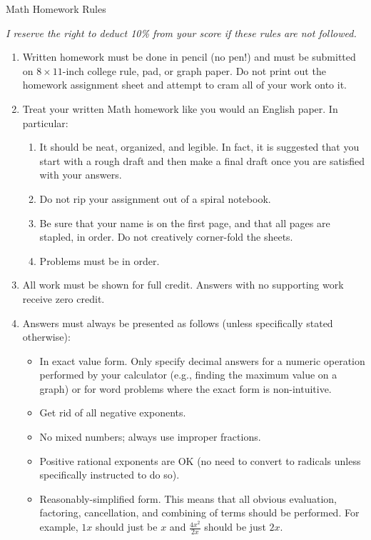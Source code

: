 \documentclass[letterpaper,12pt,fleqn]{article}
\begin{document}
\begin{center}
  {\Large Math Homework Rules}

  \vspace{0.25in}

  \emph{I reserve the right to deduct 10\% from your score if these rules are not followed.}
\end{center}

\vspace{0.25in}

\begin{enumerate}
\item Written homework must be done in pencil (no pen!) and must be submitted on \(8\times11\)-inch college rule, pad, or
  graph paper.  Do not print out the homework assignment sheet and attempt to cram all of your work onto it.

\item Treat your written Math homework like you would an English paper. In particular:
  \begin{enumerate}
  \item It should be neat, organized, and legible. In fact, it is suggested that you start with a rough draft and then make a
    final draft once you are satisfied with your answers.

  \item Do not rip your assignment out of a spiral notebook.
    
  \item Be sure that your name is on the first page, and that all pages are stapled, in order. Do not creatively corner-fold
    the sheets.
    
  \item Problems must be in order.
  \end{enumerate}

\item All work must be shown for full credit. Answers with no supporting work receive zero credit.

\item Answers must always be presented as follows (unless specifically stated otherwise):
  \begin{itemize}
  \item In exact value form.  Only specify decimal answers for a numeric operation performed by your calculator (e.g.,
    finding the maximum value on a graph) or for word problems where the exact form is non-intuitive.
  \item Get rid of all negative exponents.
  \item No mixed numbers; always use improper fractions.
  \item Positive rational exponents are OK (no need to convert to radicals unless specifically instructed to do so).
  \item Reasonably-simplified form.  This means that all obvious evaluation, factoring, cancellation, and combining of terms
    should be performed.  For example, \(1x\) should just be \(x\) and \(\frac{4x^2}{2x}\) should be just \(2x\).
  \end{itemize}


\end{enumerate}
\end{document}
